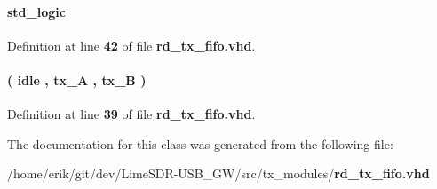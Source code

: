 \paragraph[{read\+\_\+sig}]{ {\bfseries \textcolor{comment}{std\+\_\+logic}\textcolor{vhdlchar}{ }} \hspace{0.3cm}{\ttfamily [Signal]}}\label{classrd__tx__fifo_1_1arch_a5393a912be9da66d258240ece326a45e}


Definition at line {\bf 42} of file {\bf rd\+\_\+tx\+\_\+fifo.\+vhd}.

\paragraph[{smpl\+\_\+state}]{ {\bfseries \textcolor{vhdlchar}{(}\textcolor{vhdlchar}{ }\textcolor{vhdlchar}{idle}\textcolor{vhdlchar}{ }\textcolor{vhdlchar}{,}\textcolor{vhdlchar}{ }\textcolor{vhdlchar}{tx\+\_\+A}\textcolor{vhdlchar}{ }\textcolor{vhdlchar}{,}\textcolor{vhdlchar}{ }\textcolor{vhdlchar}{tx\+\_\+B}\textcolor{vhdlchar}{ }\textcolor{vhdlchar}{)}\textcolor{vhdlchar}{ }} \hspace{0.3cm}{\ttfamily [Type]}}\label{classrd__tx__fifo_1_1arch_a25bbeeed149b94158b9561c166c23a7f}


Definition at line {\bf 39} of file {\bf rd\+\_\+tx\+\_\+fifo.\+vhd}.



The documentation for this class was generated from the following file\+:\begin{DoxyCompactItemize}
\item 
/home/erik/git/dev/\+Lime\+S\+D\+R-\/\+U\+S\+B\+\_\+\+G\+W/src/tx\+\_\+modules/{\bf rd\+\_\+tx\+\_\+fifo.\+vhd}\end{DoxyCompactItemize}
